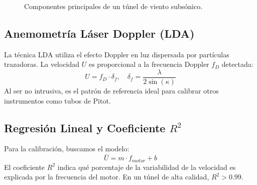 \documentclass[11pt, a4paper]{article}
\begin{document}
\begin{figure}[htbp]
    \centering
    \caption{Componentes principales de un túnel de viento subsónico.}
\end{figure}

\subsection{Anemometría Láser Doppler (LDA)}
La técnica LDA utiliza el efecto Doppler en luz dispersada por partículas trazadoras. La velocidad $U$ es proporcional a la frecuencia Doppler $f_D$ detectada:
\begin{equation}
    U = f_D \cdot \delta_f, \quad \delta_f = \frac{\lambda}{2\sin(\kappa)}
\end{equation}
Al ser no intrusiva, es el patrón de referencia ideal para calibrar otros instrumentos como tubos de Pitot.

\subsection{Regresión Lineal y Coeficiente $R^2$}
Para la calibración, buscamos el modelo:
\begin{equation}
    \bar{U} = m \cdot f_{motor} + b
\end{equation}
El coeficiente $R^2$ indica qué porcentaje de la variabilidad de la velocidad es explicada por la frecuencia del motor. En un túnel de alta calidad, $R^2 > 0.99$.
\end{document}
